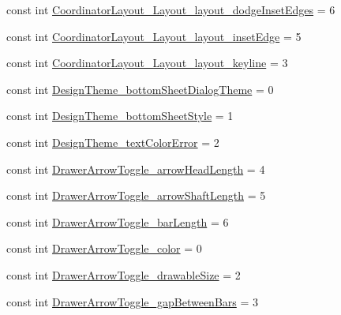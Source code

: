 \begin{DoxyCompactItemize}
\item 
const int \mbox{\hyperlink{class_f_w_p_s___app_1_1_droid_1_1_resource_1_1_styleable_a17a8b6a3448dbbb8a839cdb2e1fee8c7}{Coordinator\+Layout\+\_\+\+Layout\+\_\+layout\+\_\+dodge\+Inset\+Edges}} = 6
\item 
const int \mbox{\hyperlink{class_f_w_p_s___app_1_1_droid_1_1_resource_1_1_styleable_a6636b338d4501e555e9306d7546f9e0d}{Coordinator\+Layout\+\_\+\+Layout\+\_\+layout\+\_\+inset\+Edge}} = 5
\item 
const int \mbox{\hyperlink{class_f_w_p_s___app_1_1_droid_1_1_resource_1_1_styleable_a8ba749ca1dc7a1ae1d58123e6925223f}{Coordinator\+Layout\+\_\+\+Layout\+\_\+layout\+\_\+keyline}} = 3
\item 
const int \mbox{\hyperlink{class_f_w_p_s___app_1_1_droid_1_1_resource_1_1_styleable_a4cbfef93012fcb6d5fef0a88bda62b8e}{Design\+Theme\+\_\+bottom\+Sheet\+Dialog\+Theme}} = 0
\item 
const int \mbox{\hyperlink{class_f_w_p_s___app_1_1_droid_1_1_resource_1_1_styleable_a8cf68553d5a363aaf3a45ce40cf2a350}{Design\+Theme\+\_\+bottom\+Sheet\+Style}} = 1
\item 
const int \mbox{\hyperlink{class_f_w_p_s___app_1_1_droid_1_1_resource_1_1_styleable_af18fe27f63adea5a7d10a60f7c5b79d9}{Design\+Theme\+\_\+text\+Color\+Error}} = 2
\item 
const int \mbox{\hyperlink{class_f_w_p_s___app_1_1_droid_1_1_resource_1_1_styleable_aded33c8b8d8edae6df07cd455b87e2c1}{Drawer\+Arrow\+Toggle\+\_\+arrow\+Head\+Length}} = 4
\item 
const int \mbox{\hyperlink{class_f_w_p_s___app_1_1_droid_1_1_resource_1_1_styleable_ae9bbdaee9af818545f081a77936c7495}{Drawer\+Arrow\+Toggle\+\_\+arrow\+Shaft\+Length}} = 5
\item 
const int \mbox{\hyperlink{class_f_w_p_s___app_1_1_droid_1_1_resource_1_1_styleable_a636f5d93d222ce6bc9d483841bc6ca17}{Drawer\+Arrow\+Toggle\+\_\+bar\+Length}} = 6
\item 
const int \mbox{\hyperlink{class_f_w_p_s___app_1_1_droid_1_1_resource_1_1_styleable_a77a53eb02b8185e9eade26d8d318c2d7}{Drawer\+Arrow\+Toggle\+\_\+color}} = 0
\item 
const int \mbox{\hyperlink{class_f_w_p_s___app_1_1_droid_1_1_resource_1_1_styleable_a35af848b1c6e5968c36204a5fb19715d}{Drawer\+Arrow\+Toggle\+\_\+drawable\+Size}} = 2
\item 
const int \mbox{\hyperlink{class_f_w_p_s___app_1_1_droid_1_1_resource_1_1_styleable_a956b32c604fc7fe9f3618fc361cbade8}{Drawer\+Arrow\+Toggle\+\_\+gap\+Between\+Bars}} = 3

\end{DoxyCompactItemize}
